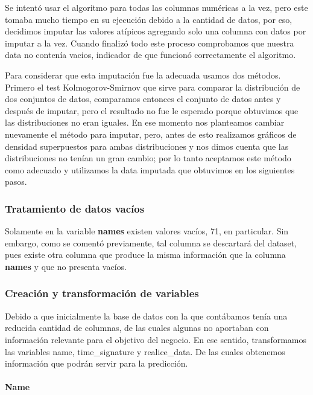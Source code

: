 \documentclass[
  letterpaper,
  DIV=11,
  numbers=noendperiod]{scrartcl}
\let\oldparagraph\paragraph
\renewcommand{\paragraph}[1]{\oldparagraph{#1}\mbox{}}
\begin{document}
Se intentó usar el algoritmo para todas las columnas numéricas a la vez,
pero este tomaba mucho tiempo en su ejecución debido a la cantidad de
datos, por eso, decidimos imputar las valores atípicos agregando solo
una columna con datos por imputar a la vez. Cuando finalizó todo este
proceso comprobamos que nuestra data no contenía vacios, indicador de
que funcionó correctamente el algoritmo.

Para considerar que esta imputación fue la adecuada usamos dos métodos.
Primero el test Kolmogorov-Smirnov que sirve para comparar la
distribución de dos conjuntos de datos, comparamos entonces el conjunto
de datos antes y después de imputar, pero el resultado no fue le
esperado porque obtuvimos que las distribuciones no eran iguales. En ese
momento nos planteamos cambiar nuevamente el método para imputar, pero,
antes de esto realizamos gráficos de densidad superpuestos para ambas
distribuciones y nos dimos cuenta que las distribuciones no tenían un
gran cambio; por lo tanto aceptamos este método como adecuado y
utilizamos la data imputada que obtuvimos en los siguientes pasos.

\hypertarget{tratamiento-de-datos-vacuxedos}{%
\subsubsection{Tratamiento de datos
vacíos}\label{tratamiento-de-datos-vacuxedos}}

Solamente en la variable \textbf{names} existen valores vacíos, 71, en
particular. Sin embargo, como se comentó previamente, tal columna se
descartará del dataset, pues existe otra columna que produce la misma
información que la columna \textbf{names} y que no presenta vacíos.

\hypertarget{creaciuxf3n-y-transformaciuxf3n-de-variables}{%
\subsubsection{Creación y transformación de
variables}\label{creaciuxf3n-y-transformaciuxf3n-de-variables}}

Debido a que inicialmente la base de datos con la que contábamos tenía
una reducida cantidad de columnas, de las cuales algunas no aportaban
con información relevante para el objetivo del negocio. En ese sentido,
transformamos las variables name, time\_signature y realice\_data. De
las cuales obtenemos información que podrán servir para la predicción.

\hypertarget{name}{%
\paragraph{Name}\label{name}}
\end{document}
